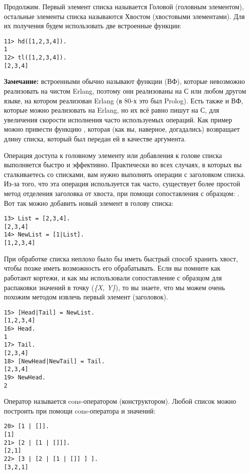 Продолжим. Первый элемент списка называется Головой (головным элементом), остальные элементы списка называются Хвостом (хвостовыми элементами). Для их получения будем использовать две встроенные функции:
\begin{lstlisting}[style=repl]
11> hd([1,2,3,4]).
1
12> tl([1,2,3,4]).
[2,3,4]
\end{lstlisting}
\colorbox{lgray}
{
    \begin{minipage}{1.0\linewidth}
        \textbf{Замечание:} встроенными обычно называют функции (ВФ), которые невозможно реализовать на чистом Erlang, поэтому они реализованы на С или любом другом языке, на котором реализован Erlang (в 80\--х это был Prolog). Есть также и ВФ, которые можно реализовать на Erlang, но их всё равно пишут на С, для увеличения скорости исполнения часто используемых операций. Как пример можно привести функцию , которая (как вы, наверное, догадались) возвращает длину списка, который был передан ей в качестве аргумента.
    \end{minipage}
}

Операция доступа к головному элементу или добавления к голове списка выполняется быстро и эффективно. Практически во всех случаях, в которых вы сталкиваетесь со списками, вам нужно выполнять операции с заголовком списка. Из\--за того, что эта операция используется так часто, существует более простой метод отделения заголовка от хвоста, при помощи сопоставления с образцом: . Вот так можно добавить новый элемент в голову списка:
\begin{lstlisting}[style=repl]
13> List = [2,3,4].
[2,3,4]
14> NewList = [1|List].
[1,2,3,4]
\end{lstlisting}

При обработке списка неплохо было бы иметь быстрый способ хранить хвост, чтобы позже иметь возможность его обрабатывать. Если вы помните как работают кортежи, и как мы использовали сопоставление с образцом для распаковки значений в точку (\emph{\{X, Y\}}), то вы знаете, что мы можем очень похожим методом извлечь первый элемент (заголовок).
\begin{lstlisting}[style=repl]
15> [Head|Tail] = NewList.
[1,2,3,4]
16> Head.
1
17> Tail.
[2,3,4]
18> [NewHead|NewTail] = Tail.
[2,3,4]
19> NewHead.
2
\end{lstlisting}

Оператор \ops{|} называется cons\--оператором (конструктором). Любой список можно построить при помощи cons\--оператора и значений:
\begin{lstlisting}[style=repl]
20> [1 | []].
[1]
21> [2 | [1 | []]].
[2,1]
22> [3 | [2 | [1 | []] ] ].
[3,2,1]
\end{lstlisting}

